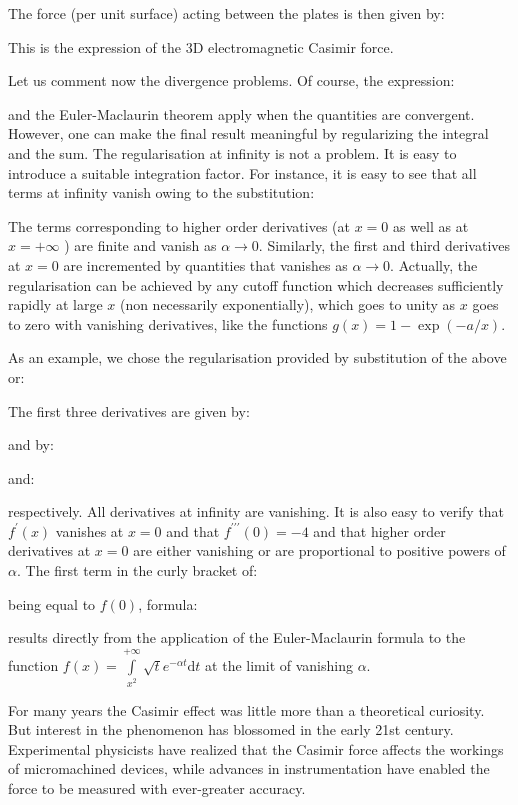 	The force (per unit surface) acting between the plates is then given by:
	
	This is the expression of the 3D electromagnetic Casimir force.
	
	Let us comment now the divergence problems. Of course, the expression:
	
	and the Euler-Maclaurin theorem apply when the quantities are convergent. However, one can make the final result meaningful by regularizing the integral and the sum. The regularisation at infinity is not a problem. It is easy to introduce a suitable integration factor. For instance, it is easy to see that all terms at infinity vanish owing to the substitution:
	
	The terms corresponding to higher order derivatives (at $x=0$ as well as at $x=+\infty$ ) are finite and vanish as $\alpha \rightarrow 0$. Similarly, the first and third derivatives at $x=0$ are incremented by quantities that vanishes as $\alpha \rightarrow 0$. Actually, the regularisation can be achieved by any cutoff function which decreases sufficiently rapidly at large $x$ (non necessarily exponentially), which goes to unity as $x$ goes to zero with vanishing derivatives, like the functions $g(x)=1-\exp (-a / x)$.
	
	\begin{tcolorbox}[title=Remark,colframe=black,arc=10pt]
	As an example, we chose the regularisation provided by substitution of the above or:
	
	The first three derivatives are given by:
	
	and by:
	
	and:
	
	respectively. All derivatives at infinity are vanishing. It is also easy to verify that $f^{\prime}(x)$ vanishes at $x=0$ and that $f^{\prime \prime \prime}(0)=-4$ and that higher order derivatives at $x=0$ are either vanishing or are proportional to positive powers of $\alpha .$ The first term in the curly bracket of:
	
	being equal to $f(0)$, formula:
	
	results directly from the application of the Euler-Maclaurin formula to the function $f(x)=\int\limits_{x^{2}}^{+\infty}\sqrt{t} e^{-\alpha t}\mathrm{d}t$ at the limit of vanishing $\alpha$.
	\end{tcolorbox}
	For many years the Casimir effect was little more than a theoretical curiosity. But interest in the phenomenon has blossomed in the early 21st century. Experimental physicists have realized that the Casimir force affects the workings of micromachined devices, while advances in instrumentation have enabled the force to be measured with ever-greater accuracy.

